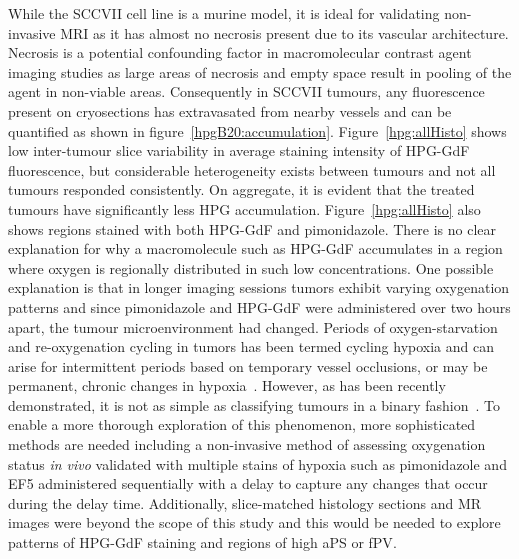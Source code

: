  While the SCCVII cell line is a murine model, it is ideal for validating non-invasive MRI as it has almost no necrosis present due to its vascular architecture.
Necrosis is a potential confounding factor in macromolecular contrast agent imaging studies as large areas of necrosis and empty space result in pooling of the agent in non-viable areas.
Consequently in SCCVII tumours, any fluorescence present on cryosections has extravasated from nearby vessels and can be quantified as shown in figure~\ref{hpgB20:accumulation}.
Figure~\ref{hpg:allHisto} shows low inter-tumour slice variability in average staining intensity of \acs{HPG-GdF} fluorescence, but considerable heterogeneity exists between tumours and not all tumours responded consistently.
On aggregate, it is evident that the treated tumours have significantly less HPG accumulation.
Figure~\ref{hpg:allHisto} also shows regions stained with both \acs{HPG-GdF} and pimonidazole.
There is no clear explanation for why a macromolecule such as \acs{HPG-GdF} accumulates in a region where oxygen is regionally distributed in such low concentrations.
One possible explanation is that in longer imaging sessions tumors exhibit varying oxygenation patterns and since pimonidazole and \acs{HPG-GdF} were administered over two hours apart, the tumour microenvironment had changed. 
Periods of oxygen-starvation and re-oxygenation cycling in tumors has been termed cycling hypoxia and can arise for intermittent periods based on temporary vessel occlusions, or may be permanent, chronic changes in hypoxia~\cite{Dewhirst:2009de,Michiels:2016hv}.
However, as has been recently demonstrated, it is not as simple as classifying tumours in a binary fashion~\cite{Bayer:2011js}.
To enable a more thorough exploration of this phenomenon, more sophisticated methods are needed including a non-invasive method of assessing oxygenation status \emph{in vivo} validated with multiple stains of hypoxia such as pimonidazole and EF5 administered sequentially with a delay to capture any changes that occur during the delay time.
Additionally, slice-matched histology sections and MR images were beyond the scope of this study and this would be needed to explore patterns of \acs{HPG-GdF} staining and regions of high \acs{aPS} or \acs{fPV}.

